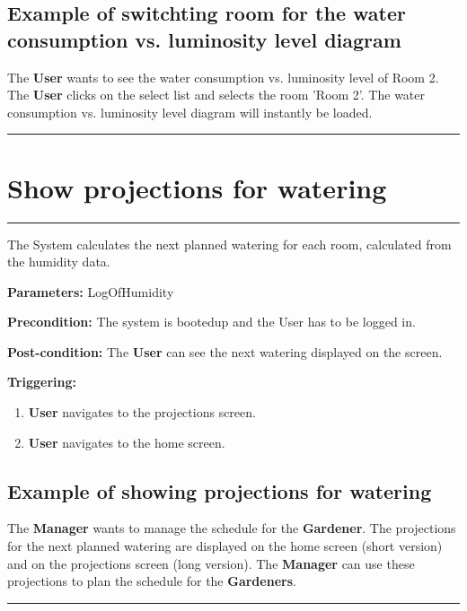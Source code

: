 \subsection{Example of switchting room for the water consumption vs. luminosity level diagram}
The \textbf{User} wants to see the water consumption vs. luminosity level of Room 2. The \textbf{User} clicks on the select list and selects the room 'Room 2'. 
The water consumption vs. luminosity level diagram will instantly be loaded.
\hfill
\vspace{0.5cm}
\hrule




\section{Show projections for watering}
\hrule
\hfill
\vspace{0.5cm}
\label{operation:Show projections for watering}

The System calculates the next planned watering for each room, calculated from the humidity data.

\begin{description}

\item \textbf{Parameters:} LogOfHumidity
\item \textbf{Precondition:} The system is bootedup and the User has to be
logged in.
\item \textbf{Post-condition:} The \textbf{User} can see the next watering displayed on the screen.
\item \textbf{Triggering:}
\begin{enumerate}

\item \textbf{User} navigates to the projections screen.
\item \textbf{User} navigates to the home screen.

\end{enumerate}
\end{description}

\subsection{Example of showing projections for watering}
The \textbf{Manager} wants to manage the schedule for the \textbf{Gardener}. The projections for the next planned watering are displayed on the home screen (short version) 
and on the projections screen (long version). The \textbf{Manager} can use these projections to plan the schedule for the \textbf{Gardeners}.
\hfill
\vspace{0.5cm}
\hrule




